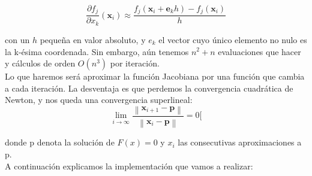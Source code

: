 \[\frac{\partial f_{j}}{\partial x_{k}}\left(\mathbf{x}_{i}\right) \approx \frac{f_{j}\left(\mathbf{x}_{i}+\mathbf{e}_{k} h\right)-f_{j}\left(\mathbf{x}_{i}\right)}{h}\]

con un $h$ pequeña en valor absoluto, y $e_k$ el vector cuyo único elemento no nulo es la k-ésima coordenada.
Sin embargo, aún tenemos $n^2 + n$ evaluaciones que hacer y cálculos de orden $O(n^3)$ por iteración.\\
Lo que haremos será aproximar la función Jacobiana por una función que cambia a cada iteración. La desventaja es que perdemos la convergencia cuadrática de Newton, y nos queda una convergencia superlineal:
\[\lim _{i \rightarrow \infty} \frac{\left\|\mathbf{x}_{i+1}-\mathbf{p}\right\|}{\left\|\mathbf{x}_{i}-\mathbf{p}\right\|}=0[\]

donde p denota la solución de $F(x) = 0$ y $x_{i}$ las consecutivas aproximaciones a p. \\
A continuación explicamos la implementación que vamos a realizar:


